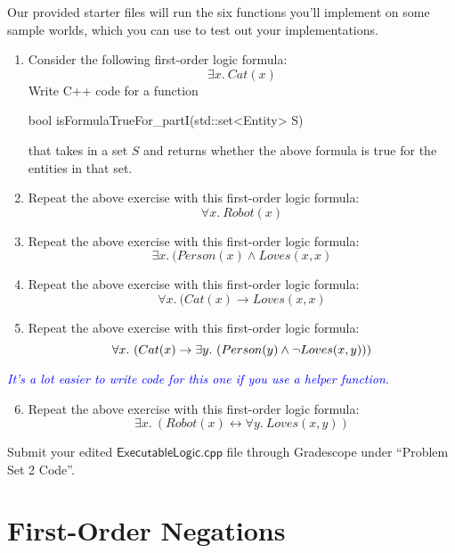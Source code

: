 \documentclass{article}
\renewcommand{\(}{\left(}
\renewcommand{\)}{\right)}
\theoremstyle{plain}
\theoremstyle{plain}
\theoremstyle{definition}
\newcommand{\annotate}[1]{\textit{\textcolor{blue}{#1}}}
\begin{document}
Our provided starter files will run the six functions you’ll implement on some sample worlds, which you
can use to test out your implementations.

\begin{enumerate}[label*=\roman*.,ref=\roman*]
    \item Consider the following first-order logic formula:
    \[ \exists x.\ Cat(x) \]
    Write C++ code for a function
    \begin{center}
        bool isFormulaTrueFor\_partI(std::set<Entity> S)
    \end{center}
    that takes in a set $S$ and returns whether the above formula is true for the entities in that set.
    \item Repeat the above exercise with this first-order logic formula:
    \[ \forall x.\ Robot(x)\]
    \item Repeat the above exercise with this first-order logic formula:
    \[ \exists x.\ (Person(x) \land Loves(x, x)\]
    \item Repeat the above exercise with this first-order logic formula:
    \[ \forall x.\ (Cat(x) \rightarrow Loves(x, x)\]
    \item Repeat the above exercise with this first-order logic formula:
    \[ \forall x.\ (Cat(x) \rightarrow \\
        \exists y.\ (Person(y) \land \neg Loves(x, y))\\
    )
    \]
\end{enumerate}

\annotate{It's a lot easier to write code for this one if you use a helper function.}

\begin{enumerate}[label*=\roman*.,ref=\roman*]
\setcounter{enumi}{5}
\item Repeat the above exercise with this first-order logic formula:
    \[ \exists x.\ (Robot(x) \leftrightarrow \forall y.\ Loves(x, y))
    \]
\end{enumerate}

\begin{shaded}
  Submit your edited $\mathsf{ExecutableLogic.cpp}$ file
  through Gradescope under ``Problem Set 2 Code''.
\end{shaded}



\pagebreak


\section{First-Order Negations}
\end{document}
